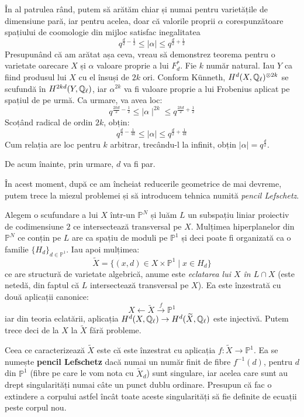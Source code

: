 \documentclass[13pt,openany]{book}
\begin{document}
În al patrulea rând, putem să arătăm chiar și numai pentru varietățile de dimensiune pară, iar pentru acelea, doar că valorile proprii $\alpha$ corespunzătoare spațiului de coomologie din mijloc satisfac inegalitatea
$$q^{\frac{d}{2}-\frac{1}{2}}\leq\mid \alpha\mid \leq q^{\frac{d}{2}+\frac{1}{2}}$$
Presupunând că am arătat așa ceva, vreau să demonstrez teorema pentru o varietate oarecare $X$ și $\alpha$ valoare proprie a lui $F^*_d$. Fie $k$ număr natural. Iau $Y$ ca fiind produsul lui $X$ cu el însuși de $2k$ ori. Conform Künneth, $H^d(X,\mathbb{Q}_\ell)^{\otimes 2k}$ se scufundă în $H^{2kd}(Y,\mathbb{Q}_\ell)$, iar $\alpha^{2k}$ va fi valoare proprie a lui Frobenius aplicat pe spațiul de pe urmă. Ca urmare, va avea loc:
$$q^{\frac{2kd}{2}-\frac{1}{2}}\leq\mid \alpha\mid ^{2k}\leq q^{\frac{2kd}{2}+\frac{1}{2}}$$
Scoțând radical de ordin $2k$, obțin:
$$q^{\frac{d}{2}-\frac{1}{4k}}\leq\mid \alpha\mid \leq q^{\frac{d}{2}+\frac{1}{4k}}$$
Cum relația are loc pentru $k$ arbitrar, trecându-l la infinit, obțin $\mid \alpha\mid =q^{\frac{d}{2}}$.

De acum înainte, prin urmare, $d$ va fi par.

În acest moment, după ce am încheiat reducerile geometrice de mai devreme, putem trece la miezul problemei și să introducem tehnica numită {\it pencil Lefschetz}.

Alegem o scufundare a lui $X$ într-un $\mathbb{P}^N$ și luăm $L$ un subspațiu liniar proiectiv de codimensiune $2$ ce intersectează transversal pe $X$. Mulțimea hiperplanelor din $\mathbb{P}^N$ ce conțin pe $L$ are ca spațiu de moduli pe $\mathbb{P}^1$ și deci poate fi organizată ca o familie $\{H_d\}_{d\in\mathbb{P}^1}$. Iau apoi mulțimea:
$$\widetilde{X}=\{(x,d)\in X \times \mathbb{P}^1 \mid x \in H_d\}$$
ce are structură de varietate algebrică, anume este {\it eclatarea lui $X$ în $L\cap X$} (este netedă, din faptul că $L$ intersectează transversal pe $X$). Ea este înzestrată cu două aplicații canonice:
$$X \leftarrow \widetilde{X} \xrightarrow{f} \mathbb{P}^1$$
iar din teoria eclatării, aplicația $H^d(X,\mathbb{Q}_\ell) \rightarrow H^d(\widetilde{X},\mathbb{Q}_\ell)$ este injectivă. Putem trece deci de la $X$ la $\widetilde{X}$ fără probleme.

Ceea ce caracterizează $\widetilde{X}$ este că este înzestrat cu aplicația $f : \widetilde{X} \rightarrow \mathbb{P}^1$. Ea se numește {\bf pencil Lefschetz} dacă numai un număr finit de fibre $f^{-1}(d)$, pentru $d$ din $\mathbb{P}^1$ (fibre pe care le vom nota cu $\widetilde{X}_d$) sunt singulare, iar acelea care sunt au drept singularități numai câte un punct dublu ordinare. Presupun că fac o extindere a corpului astfel încât toate aceste singularități să fie definite de ecuații peste corpul nou.
\end{document}
